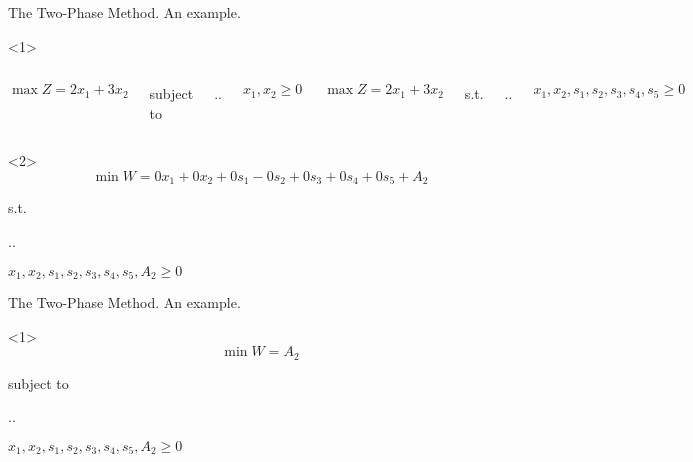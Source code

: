 \begin{frame}{The Two-Phase Method. An example.}{}
  \begin{onlyenv}<1>
    \begin{columns}[t]

\[        \max Z = 2x_1 + 3x_2  \]

{\centering
  subject to

  \sysdelim..%

  \vspace{5mm}
  $x_1, x_2  \geq 0$
  \par}
        
      \[ \max Z = 2x_1 + 3x_2\]
      {\centering
        s.t.

      \sysdelim..%

      \vspace{5mm}
      $x_1, x_2, s_1, s_2, s_3, s_4, s_5  \geq 0$
    \par} 
    \end{columns}
  \end{onlyenv}

  \begin{onlyenv}<2>
    \[ \min W = 0x_1 + 0x_2 +0s_1 - 0s_2 + 0s_3 + 0s_4 + 0s_5 + A_2 \]

    {\centering
      s.t.
      
    \sysdelim..%

    $x_1, x_2, s_1, s_2, s_3, s_4, s_5, A_2  \geq 0$
  \par}
  \end{onlyenv}
\end{frame}

\begin{frame}{The Two-Phase Method. An example.}{}
  \begin{onlyenv}<1>
    \[ \min W = A_2 \]

    {\centering
    subject to

    \sysdelim..

    \vspace{5mm}
    $x_1, x_2, s_1, s_2, s_3, s_4, s_5, A_2  \geq 0$
    \par}
  \end{onlyenv}
\end{frame}

